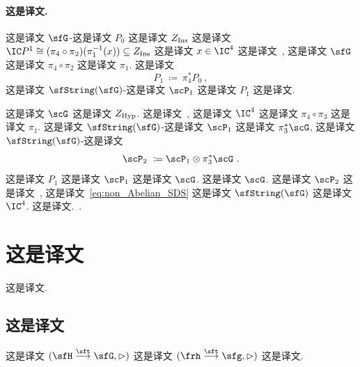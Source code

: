\documentclass[
    affil-it, %
    auth-lg, %
    british, %
    compression, %
    contents, %
    custom-packages={}, %
    references={bigone}, %
]{lib/preprint}
\begin{document}
\begin{body}
        \paragraph{这是译文.}
 这是译文 $\sfG$-这是译文 $P_0$ 这是译文 $Z_{\rm Ins}$ 这是译文 $\IC P^1\cong(\pi_4\circ\pi_2)(\pi_1^{-1}(x))\subseteq Z_{\rm Ins}$ 这是译文 $x\in\IC^4$ 这是译文~\cite{Ward:1977ta}, 这是译文 $\sfG$ 这是译文 $\pi_4\circ\pi_2$ 这是译文 $\pi_1$. 这是译文 
        \begin{equation}
            P_1\ \coloneqq\ \pi^*_4 P_0~,
        \end{equation}  这是译文 $\sfString(\sfG)$-这是译文 $\scP_1$ 这是译文 $P_1$ 这是译文.
        
 这是译文 $\scG$ 这是译文 $Z_{\rm Hyp}$. 这是译文~\cite{Saemann:2011nb}, 这是译文 $\IC^4$ 这是译文 $\pi_4\circ\pi_3$ 这是译文 $\pi_1$. 这是译文 $\sfString(\sfG)$-这是译文 $\scP_1$ 这是译文 $\pi_3^*\scG$, 这是译文 $\sfString(\sfG)$-这是译文 
        \begin{equation}
            \scP_2\ \coloneqq \scP_1\otimes\pi^*_3\scG~.
        \end{equation}  这是译文 $P_1$ 这是译文 $\scP_1$ 这是译文 $\scG$. 这是译文 $\scG$. 这是译文 $\scP_2$ 这是译文~\cite{Saemann:2012uq}, 这是译文~\eqref{eq:non_Abelian_SDS} 这是译文 $\sfString(\sfG)$ 这是译文 $\IC^4$. 这是译文.~\cite{Saemann:2012uq}.

        \appendix
        \addappheadtotoc
        \appendixpage

        \section{这是译文}
        
这是译文.
        
        \subsection{这是译文}\label{app:useful}
        
这是译文 $(\sfH\overset{\sft}{\longrightarrow}\sfG,\acton)$ 这是译文 $(\frh\overset{\sft}{\longrightarrow}\sfg,\acton)$ 这是译文. 


\end{body}
\end{document}
